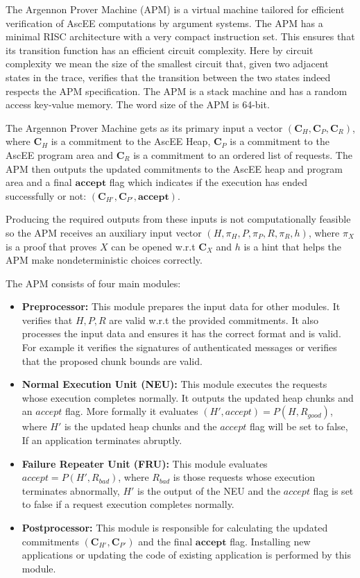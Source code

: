 
The Argennon Prover Machine (APM) is a virtual machine tailored for efficient verification of AscEE computations by
argument systems. The APM has a minimal RISC architecture with a very compact instruction set. This ensures that
its transition function has an efficient circuit complexity. Here by circuit complexity we mean the size
of the smallest circuit that, given two adjacent states in the trace, verifies that the transition between the two
states indeed respects the APM specification. The APM is a stack machine and has a random access key-value memory.
The word size of the APM is 64-bit.

The Argennon Prover Machine gets as its primary input a vector $(\mathbf{C}_H,\mathbf{C}_P,\mathbf{C}_R)$, where
$\mathbf{C}_H$ is a commitment to the AscEE Heap, $\mathbf{C}_P$ is a commitment to the AscEE program area and
$\mathbf{C}_R$ is a commitment to an ordered list of requests. The APM then outputs the updated
commitments to the AscEE heap and program area and a final $\mathbf{accept}$ flag which indicates if the execution has
ended successfully or not: $(\mathbf{C}_{H'},\mathbf{C}_{P'},\mathbf{accept})$.

Producing the required outputs from these inputs is not computationally feasible so the APM receives an auxiliary
input vector $(H,\pi_H,P,\pi_P,R,\pi_R,h)$, where $\pi_X$ is a proof that proves $X$ can be opened w.r.t
$\mathbf{C}_X$ and $h$ is a hint that helps the APM make nondeterministic choices correctly.

The APM consists of four main modules:
\begin{itemize}
    \item \textbf{Preprocessor:} This module prepares the input data for other modules. It verifies that $H,
    P,R$ are valid w.r.t the provided commitments. It also processes the input data and ensures it has the
    correct format and is valid. For example it verifies the signatures of authenticated messages or
    verifies that the proposed chunk bounds are valid.
    \item \textbf{Normal Execution Unit (NEU):} This module executes the requests whose execution completes
    normally. It outputs the updated heap chunks and an $accept$ flag. More formally it evaluates $(H',accept)=P(H,
    R_{good})$, where $H'$ is the updated heap chunks and the $accept$ flag will be set to false, If an
    application terminates abruptly.
    \item \textbf{Failure Repeater Unit (FRU):} This module evaluates $accept=P(H',R_{bad})$, where $R_{bad}$ is
    those requests whose execution terminates abnormally, $H'$ is the output of the NEU and the $accept$ flag is set
    to false if a request execution completes normally.
    \item \textbf{Postprocessor:} This module is responsible for calculating the updated commitments
    $(\mathbf{C}_{H'}, \mathbf{C}_{P'})$ and the final $\mathbf{accept}$ flag. Installing new applications or
    updating the code of existing application is performed by this module.
\end{itemize}

